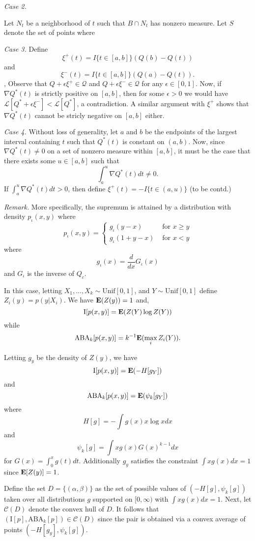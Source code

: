 \documentclass[12pt]{article}
\begin{document}
\emph{Case 2.}


Let $N_t$ be a neighborhood of $t$ such that $B \cap N_t$ has nonzero
measure.  Let $S$ denote the set of points where 


\emph{Case 3.}
Define
\[
\xi^+(t) = I\{t \in [a,b]\} (Q(b) - Q(t))
\]
and
\[
\xi^-(t) = I\{t \in [a,b]\} (Q(a) - Q(t)).
\],
Observe that $Q + \epsilon \xi^+ \in \mathcal{Q}$ and $Q
+ \epsilon \xi^- \in \mathcal{Q}$ for any $\epsilon \in [0,1]$.  Now,
if $\nabla Q^*(t)$ is strictly positive on $[a,b]$, then for some
$\epsilon > 0$ we would have $\mathcal{L}[Q^* + \epsilon \xi^-]
< \mathcal{L}[Q^*]$, a contradiction.  A similar argument with $\xi^+$
shows that $\nabla Q^*(t)$ cannot be stricly negative on $[a, b]$
either.

\emph{Case 4.}
Without loss of generality, let $a$ and $b$ be the endpoints of the
largest interval containing $t$ such that $Q^*(t)$ is constant on $(a,
b)$.  Now, since $\nabla Q^*(t) \neq 0$ on a set of nonzero measure
within $[a, b]$, it must be the case that there exists some $u \in [a,
b]$ such that
\[
\int_a^u \nabla Q^*(t) dt \neq 0.
\]
If $\int_a^u \nabla Q^*(t) dt > 0$, then define $\xi^+(t) = -I\{t \in
(a, u)\}$ (to be contd.)



\emph{Remark.}
More specifically, the supremum is attained by a distribution with
density $p_\iota(x, y)$ where
\[
p_\iota(x, y) = \begin{cases}
g_\iota(y - x) & \text{ for } x\geq y\\
g_\iota(1 + y - x) & \text{ for } x < y
\end{cases}
\]
where
\[
g_\iota(x) = \frac{d}{dx}G_\iota(x)
\]
and $G_\iota$ is the inverse of $Q_c$.



In this case, letting $X_1,...,X_k \sim \text{Unif}[0,1]$, and $Y \sim \text{Unif}[0,1]$ define $Z_i(y) = p(y|X_i)$.
We have $\textbf{E}(Z(y)) = 1$ and,
\[
\text{I}[p(x,y)] = \textbf{E}(Z(Y) \log Z(Y))
\]
while
\[
\text{ABA}_k[p(x,y)] = k^{-1}\textbf{E}(\max_i Z_i(Y)).
\]

Letting $g_y$ be the density of $Z(y)$, we have
\[
\text{I}[p(x,y)] = \textbf{E}(-H[g_Y])
\]
and
\[
\text{ABA}_k[p(x,y)] = \textbf{E}(\psi_k[g_Y])
\]
where
\[
H[g] = -\int g(x) x \log x dx
\]
and
\[
\psi_k[g] = \int x g(x) G(x)^{k-1} dx
\]
for $G(x) = \int_0^x g(t) dt.$
Additionally $g_y$ satisfies the constraint $\int x g(x) dx= 1$ since $\textbf{E}[Z(y)] = 1$.

Define the set $D = \{(\alpha, \beta)\}$ as the set of possible values
of $(-H[g], \psi_k[g])$ taken over all distributions $g$ supported on
$[0,
\infty)$ with $\int x g(x) dx = 1$.  Next, let $\mathcal{C}(D)$ denote the convex hull of $D$.
It follows that $(\text{I}[p], \text{ABA}_k[p]) \in \mathcal{C}(D)$ since the pair is obtained via a convex average of points $(-H[g_y], \psi_k[g])$.
\end{document}
